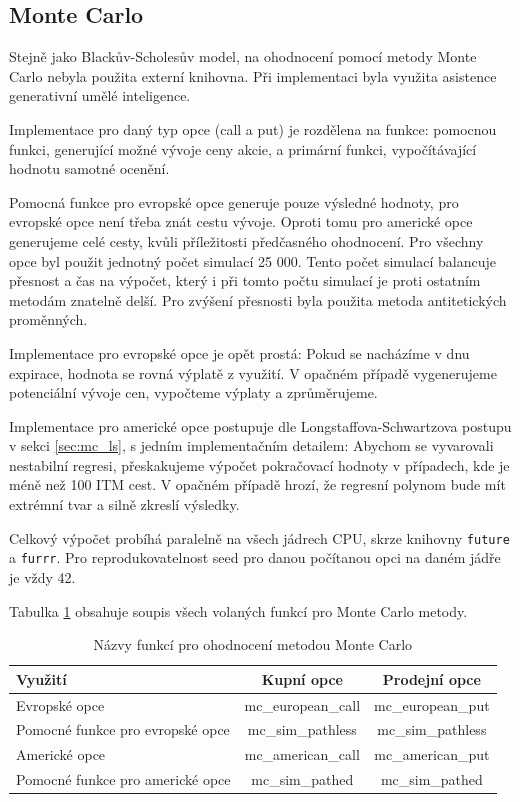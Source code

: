 \documentclass[male,czech,api_bc]{kitheses}
\begin{document}
  \subsection{Monte Carlo}

  Stejně jako Blackův-Scholesův model, na ohodnocení pomocí metody Monte Carlo nebyla použita externí knihovna. Při implementaci byla využita asistence generativní umělé inteligence.

  Implementace pro daný typ opce (call a put) je rozdělena na funkce: pomocnou funkci, generující možné vývoje ceny akcie, a primární funkci, vypočítávající hodnotu samotné ocenění.

  Pomocná funkce pro evropské opce generuje pouze výsledné hodnoty, pro evropské opce není třeba znát cestu vývoje. Oproti tomu pro americké opce generujeme celé cesty, kvůli příležitosti předčasného ohodnocení.
  Pro všechny opce byl použit jednotný počet simulací 25 000. Tento počet simulací balancuje přesnost a čas na výpočet, který i při tomto počtu simulací je proti ostatním metodám znatelně delší.
  Pro zvýšení přesnosti byla použita metoda antitetických proměnných.

  Implementace pro evropské opce je opět prostá: Pokud se nacházíme v dnu expirace, hodnota se rovná výplatě z využití. V opačném případě vygenerujeme potenciální vývoje cen, vypočteme výplaty a zprůměrujeme.

  Implementace pro americké opce postupuje dle Longstaffova-Schwartzova postupu v sekci \ref{sec:mc_ls}, s jedním implementačním detailem: Abychom se vyvarovali nestabilní regresi, přeskakujeme výpočet pokračovací hodnoty v případech, kde je méně než 100 ITM cest. V opačném případě hrozí, že regresní polynom bude mít extrémní tvar a silně zkreslí výsledky.

  Celkový výpočet probíhá paralelně na všech jádrech CPU, skrze knihovny \texttt{future} a \texttt{furrr}. Pro reprodukovatelnost seed pro danou počítanou opci na daném jádře je vždy 42.

  Tabulka \ref{tab:mc_calls} obsahuje soupis všech volaných funkcí pro Monte Carlo metody.

  \begin{table}[h!]
    \centering
    \label{tab:mc_calls}
    \caption{Názvy funkcí pro ohodnocení metodou Monte Carlo}
    \begin{tabular}{lcc}
      \toprule
      Využití & Kupní opce & Prodejní opce \\
      \midrule
      Evropské opce & mc\_european\_call & mc\_european\_put \\
      Pomocné funkce pro evropské opce & mc\_sim\_pathless & mc\_sim\_pathless \\
      \midrule
      Americké opce & mc\_american\_call & mc\_american\_put \\
      Pomocné funkce pro americké opce & mc\_sim\_pathed & mc\_sim\_pathed \\
      \bottomrule
    \end{tabular}
  \end{table}
\end{document}
